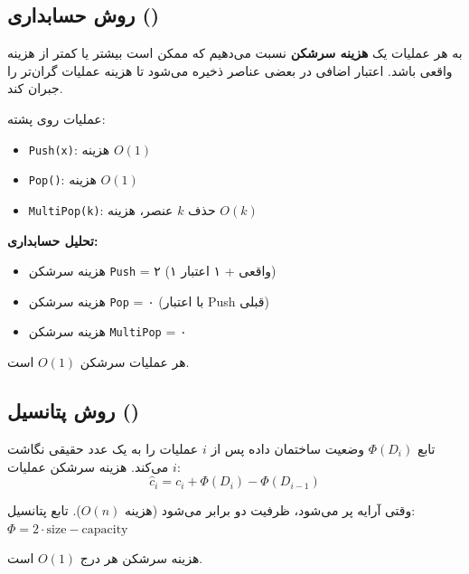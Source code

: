 \documentclass{matinbook}
\begin{document}
    \subsection{روش حسابداری ()}
    
    \begin{definition}
        به هر عملیات یک \textbf{هزینه سرشکن} نسبت می‌دهیم
        که ممکن است بیشتر یا کمتر از هزینه واقعی باشد.
        اعتبار اضافی در بعضی عناصر ذخیره می‌شود
        تا هزینه عملیات گران‌تر را جبران کند.
        \label{def:accounting}
    \end{definition}
    
    \begin{example}
        عملیات روی پشته:
        \begin{itemize}
            \item \texttt{Push(x)}: هزینه $O(1)$
            \item \texttt{Pop()}: هزینه $O(1)$
            \item \texttt{MultiPop(k)}: حذف $k$ عنصر، هزینه $O(k)$
        \end{itemize}
        
        \textbf{تحلیل حسابداری:}
        \begin{itemize}
            \item هزینه سرشکن \texttt{Push} = ۲ (۱ واقعی + ۱ اعتبار)
            \item هزینه سرشکن \texttt{Pop} = ۰ (با اعتبار Push قبلی)
            \item هزینه سرشکن \texttt{MultiPop} = ۰
        \end{itemize}
        هر عملیات سرشکن $O(1)$ است.
        \label{ex:multipop}
    \end{example}
    
    \subsection{روش پتانسیل ()}
    
    \begin{definition}
        تابع $\Phi(D_{i})$ وضعیت ساختمان داده
        پس از $i$ عملیات را به یک عدد حقیقی نگاشت می‌کند.
        هزینه سرشکن عملیات $i$:
        \[
        \hat{c}_{i} = c_{i} + \Phi(D_{i}) - \Phi(D_{i-1})
        \]
        \label{def:potential}
    \end{definition}
    
    \begin{example}
        وقتی آرایه پر می‌شود، ظرفیت دو برابر می‌شود
        (هزینه $O(n)$). تابع پتانسیل:
        $\Phi = 2 \cdot \text{size} - \text{capacity}$
        
        هزینه سرشکن هر درج $O(1)$ است.
        \label{ex:dynamic-array}
    \end{example}
    
\end{document}
